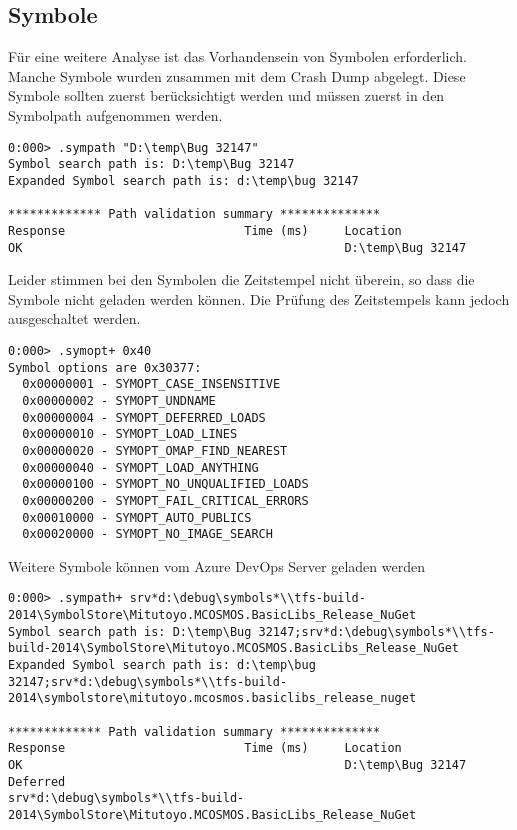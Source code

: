 \subsection{Symbole}
Für eine weitere Analyse ist das Vorhandensein von Symbolen erforderlich. Manche Symbole wurden zusammen mit dem Crash Dump abgelegt.
Diese Symbole sollten zuerst berücksichtigt werden und müssen zuerst in den Symbolpath aufgenommen werden.
\begin{lstlisting}[language=WinDbg]
0:000> .sympath "D:\temp\Bug 32147"
Symbol search path is: D:\temp\Bug 32147
Expanded Symbol search path is: d:\temp\bug 32147

************* Path validation summary **************
Response                         Time (ms)     Location
OK                                             D:\temp\Bug 32147
\end{lstlisting}

Leider stimmen bei den Symbolen die Zeitstempel nicht überein, so dass die Symbole nicht geladen werden können.
Die Prüfung des Zeitstempels kann jedoch ausgeschaltet werden.
\begin{lstlisting}[language=WinDbg]
0:000> .symopt+ 0x40
Symbol options are 0x30377:
  0x00000001 - SYMOPT_CASE_INSENSITIVE
  0x00000002 - SYMOPT_UNDNAME
  0x00000004 - SYMOPT_DEFERRED_LOADS
  0x00000010 - SYMOPT_LOAD_LINES
  0x00000020 - SYMOPT_OMAP_FIND_NEAREST
  0x00000040 - SYMOPT_LOAD_ANYTHING
  0x00000100 - SYMOPT_NO_UNQUALIFIED_LOADS
  0x00000200 - SYMOPT_FAIL_CRITICAL_ERRORS
  0x00010000 - SYMOPT_AUTO_PUBLICS
  0x00020000 - SYMOPT_NO_IMAGE_SEARCH
\end{lstlisting}

Weitere Symbole können vom Azure DevOps Server geladen werden
\begin{lstlisting}[language=WinDbg]
0:000> .sympath+ srv*d:\debug\symbols*\\tfs-build-2014\SymbolStore\Mitutoyo.MCOSMOS.BasicLibs_Release_NuGet
Symbol search path is: D:\temp\Bug 32147;srv*d:\debug\symbols*\\tfs-build-2014\SymbolStore\Mitutoyo.MCOSMOS.BasicLibs_Release_NuGet
Expanded Symbol search path is: d:\temp\bug 32147;srv*d:\debug\symbols*\\tfs-build-2014\symbolstore\mitutoyo.mcosmos.basiclibs_release_nuget

************* Path validation summary **************
Response                         Time (ms)     Location
OK                                             D:\temp\Bug 32147
Deferred                                       srv*d:\debug\symbols*\\tfs-build-2014\SymbolStore\Mitutoyo.MCOSMOS.BasicLibs_Release_NuGet
\end{lstlisting}

